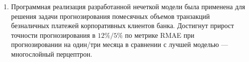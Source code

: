 \begin{enumerate}
  \item Программная реализация разработанной нечеткой модели была применена для решения задачи прогнозирования помесячных объемов транзакций безналичных платежей корпоративных клиентов банка. Достигнут прирост точности прогнозирования в $12\%/5\%$ по метрике RMAE при прогнозировании на один/три месяца в сравнении с лучшей моделью --- многослойный перцептрон. 
\end{enumerate}
